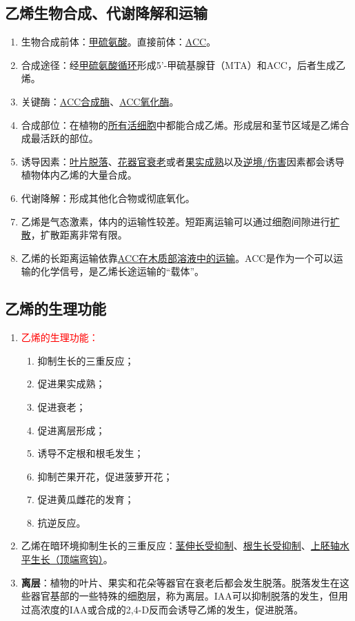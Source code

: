 \subsection{乙烯生物合成、代谢降解和运输}
\begin{enumerate}
    \item 生物合成前体：\uline{甲硫氨酸}。直接前体：\uline{ACC}。
    \item 合成途径：经\uline{甲硫氨酸循环}形成5'-甲硫基腺苷（MTA）和ACC，后者生成乙烯。
    \item 关键酶：\uline{ACC合成酶}、\uline{ACC氧化酶}。
    \item 合成部位：在植物的\uline{所有活细胞}中都能合成乙烯。形成层和茎节区域是乙烯合成最活跃的部位。
    \item 诱导因素：\uline{叶片脱落}、\uline{花器官衰老}或者\uline{果实成熟}以及\uline{逆境/伤害}因素都会诱导植物体内乙烯的大量合成。
    \item 代谢降解：形成其他化合物或彻底氧化。
    \item 乙烯是气态激素，体内的运输性较差。短距离运输可以通过细胞间隙进行\uline{扩散}，扩散距离非常有限。
    \item 乙烯的长距离运输依靠\uline{ACC在木质部溶液中的运输}。ACC是作为一个可以运输的化学信号，是乙烯长途运输的“载体”。
\end{enumerate}
\subsection{乙烯的生理功能}
\begin{enumerate}
    \item \textcolor{red}{乙烯的生理功能：}
    \begin{enumerate}
        \item 抑制生长的三重反应；
        \item 促进果实成熟；
        \item 促进衰老；
        \item 促进离层形成；
        \item 诱导不定根和根毛发生；
        \item 抑制芒果开花，促进菠萝开花；
        \item 促进黄瓜雌花的发育；
        \item 抗逆反应。
    \end{enumerate}
    \item 乙烯在暗环境抑制生长的三重反应：\uline{茎伸长受抑制}、\uline{根生长受抑制}、\uline{上胚轴水平生长（顶端弯钩）}。
    \item \textbf{离层}：植物的叶片、果实和花朵等器官在衰老后都会发生脱落。脱落发生在这些器官基部的一些特殊的细胞层，称为离层。IAA可以抑制脱落的发生，但用过高浓度的IAA或合成的2,4-D反而会诱导乙烯的发生，促进脱落。
\end{enumerate}